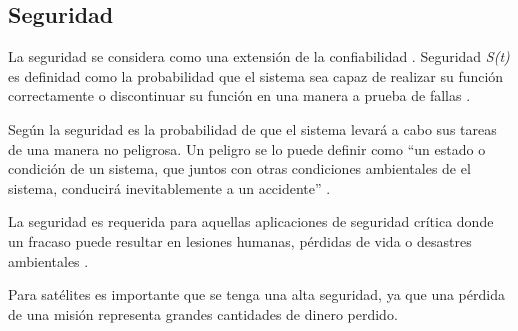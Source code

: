 \subsection{Seguridad}
La seguridad se considera como una extensión de la confiabilidad \citep{FTDesign}. Seguridad 
\textit{S(t)} es definidad como la probabilidad que el sistema sea capaz de realizar su función 
correctamente o discontinuar su función en una manera a prueba de fallas \citep{FTDesign}.

Según \cite{SoftwareFaultToleranceATutorial} la seguridad es la probabilidad de que el sistema 
levará a cabo sus tareas de una manera no peligrosa. Un peligro se lo puede definir como ``un 
estado o condición de un sistema, que juntos con otras condiciones ambientales de el sistema, 
conducirá inevitablemente a un accidente'' \citep{SoftwareFaultToleranceATutorial}.

La seguridad es requerida para aquellas aplicaciones de seguridad crítica donde un fracaso puede 
resultar en lesiones humanas, pérdidas de vida o desastres ambientales \citep{FTDesign}. 

Para satélites es importante que se tenga una alta seguridad, ya que una pérdida de una misión 
representa grandes cantidades de dinero perdido. 
